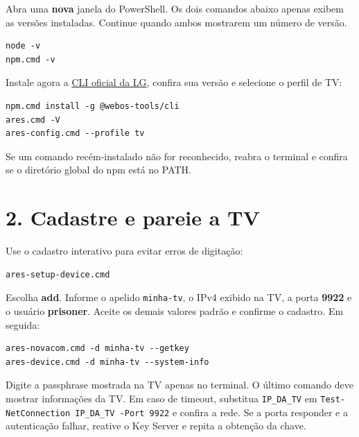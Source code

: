 \documentclass[11pt,a4paper]{article}
\begin{document}
Abra uma \textbf{nova} janela do PowerShell. Os dois comandos abaixo apenas exibem as versões instaladas. Continue quando ambos mostrarem um número de versão.
\begin{verbatim}
node -v
npm.cmd -v
\end{verbatim}
Instale agora a \href{https://webostv.developer.lge.com/develop/tools/cli-installation}{CLI oficial da LG}, confira sua versão e selecione o perfil de TV:
\begin{verbatim}
npm.cmd install -g @webos-tools/cli
ares.cmd -V
ares-config.cmd --profile tv
\end{verbatim}
Se um comando recém-instalado não for reconhecido, reabra o terminal e confira se o diretório global do npm está no PATH.
\newpage\section*{2. Cadastre e pareie a TV}
Use o cadastro interativo para evitar erros de digitação:
\begin{verbatim}
ares-setup-device.cmd
\end{verbatim}
Escolha \textbf{add}. Informe o apelido \verb|minha-tv|, o IPv4 exibido na TV, a porta \textbf{9922} e o usuário \textbf{prisoner}. Aceite os demais valores padrão e confirme o cadastro. Em seguida:
\begin{verbatim}
ares-novacom.cmd -d minha-tv --getkey
ares-device.cmd -d minha-tv --system-info
\end{verbatim}
Digite a passphrase mostrada na TV apenas no terminal. O último comando deve mostrar informações da TV. Em caso de timeout, substitua \verb|IP_DA_TV| em \verb|Test-NetConnection IP_DA_TV -Port 9922| e confira a rede. Se a porta responder e a autenticação falhar, reative o Key Server e repita a obtenção da chave.
\end{document}
